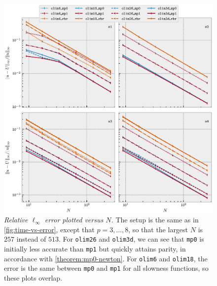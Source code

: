\documentclass{article}
\begin{document}
\begin{figure}
  \centering \includegraphics[width=\linewidth]{size_vs_error_3d.eps}
  \caption{\emph{Relative $\ell_\infty$ error plotted versus $N$.} The
    setup is the same as in \cref{fig:time-vs-error}, except that
    $p = 3, \hdots, 8$, so that the largest $N$ is $257$ instead of
    $513$. For \texttt{olim26} and \texttt{olim3d}, we can see that
    \texttt{mp0} is initially less accurate than \texttt{mp1} but
    quickly attains parity, in accordance with
    \cref{theorem:mp0-newton}. For \texttt{olim6} and \texttt{olim18},
    the error is the same between \texttt{mp0} and \texttt{mp1} for
    all slowness functions, so these plots
    overlap.}\label{fig:size-vs-error}
\end{figure}
\end{document}
